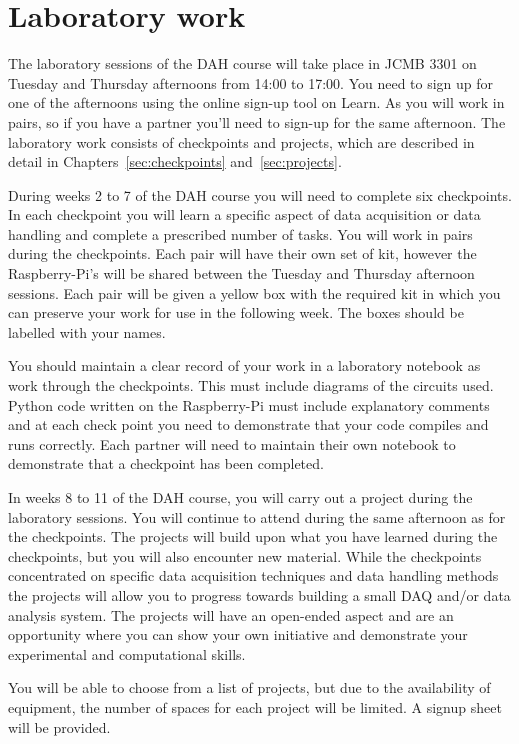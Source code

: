 \section{Laboratory work}

The laboratory sessions of the DAH course will take place in JCMB 3301 on Tuesday and Thursday afternoons from 14:00 to 17:00.  You need to sign up for one of the afternoons using the online sign-up tool on Learn. As you will work in pairs, so if you have a partner you'll need to sign-up for the same afternoon.
The laboratory work consists of checkpoints and projects, which are described in detail in Chapters~\ref{sec:checkpoints} and~\ref{sec:projects}.  

During weeks 2 to 7 of the DAH course you will need to complete six checkpoints. In each checkpoint you will learn a specific aspect of data acquisition or data handling and complete a prescribed number of tasks. You will work in pairs during the checkpoints.
Each pair will have their own set of kit, however the Raspberry-Pi's will be shared between the Tuesday and Thursday afternoon sessions. Each pair will be given a yellow box with the required kit in which you can preserve your work for use in the following week. The boxes should be labelled with your names.

You should maintain a clear record of your work in a laboratory notebook as work through the checkpoints. This must include diagrams of the circuits used. Python code written on the Raspberry-Pi must include explanatory comments and at each check point you need to demonstrate that your code compiles and runs correctly.  Each partner will need to maintain their own notebook to demonstrate that a checkpoint has been completed. 


In weeks 8 to 11 of the DAH course, you will carry out a project during the laboratory sessions. You will continue to attend during the same afternoon as for the checkpoints.
The projects will build upon what you have learned during the checkpoints, but you will also encounter new material. While the checkpoints concentrated on specific data acquisition techniques and data handling methods the projects will allow you to progress towards building a small DAQ and/or data analysis system. The projects will have an open-ended aspect and are an opportunity where you can show your own initiative and demonstrate your experimental and computational skills. 

You will be able to choose from a list of projects, but due to the availability of equipment, the number of spaces for each project will be limited. 
A signup sheet will be provided.

